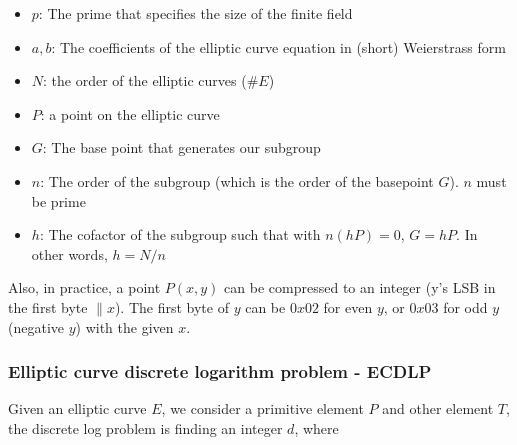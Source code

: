 \begin{itemize}
  \item$p$: The prime that specifies the size of the finite field\\
  \item$a, b$: The coefficients of the elliptic curve equation in (short) Weierstrass form\\
\item$N$: the order of the elliptic curves ($\#E$)\\
\item $P$: a point on the elliptic curve\\
\item$G$: The base point that generates our subgroup\\
\item$n$: The order of the subgroup (which is the order of the basepoint $G$). $n$ must be prime\\
\item$h$: The cofactor of the subgroup such that with $n(hP)=0$, $G = hP$. In other words, $h=N/n$\\
\end{itemize}

Also, in practice, a point $P(x,y)$ can be compressed to an integer (y’s LSB in the first byte $\|  x$). The first byte of $y$ can be $0x02$ for even $y$, or $0x03$ for odd $y$(negative $y$) with the given $x$.


\subsubsection{Elliptic curve discrete logarithm problem - ECDLP}

Given an elliptic curve $E$, we consider a primitive element $P$ and other element $T$, the discrete log problem is finding an integer $d$, where

